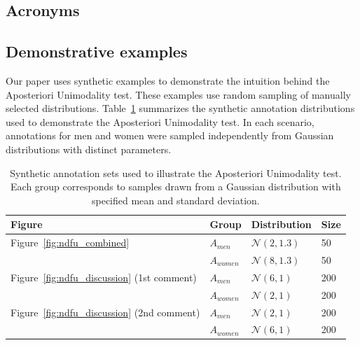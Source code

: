 \documentclass{article}
\begin{document}
\subsection{Acronyms}

\begin{acronym}[WWW]
\end{acronym}


\subsection{Demonstrative examples}

Our paper uses synthetic examples to demonstrate the intuition behind the Aposteriori Unimodality test. These examples use random sampling of manually selected distributions. Table~\ref{tab:synthetic_annotation_sets} summarizes the synthetic annotation distributions used to demonstrate the Aposteriori Unimodality test. In each scenario, annotations for men and women were sampled independently from Gaussian distributions with distinct parameters.

\begin{table}[ht]
\centering
\begin{tabular}{|l|l|l|l|}
\hline
\textbf{Figure} & \textbf{Group} & \textbf{Distribution} & \textbf{Size} \\
\hline
Figure~\ref{fig:ndfu_combined}
  & $A_{men}$   & $\mathcal{N}(2, 1.3)$  & 50 \\
  & $A_{women}$ & $\mathcal{N}(8, 1.3)$  & 50 \\
\hline
Figure~\ref{fig:ndfu_discussion} (1st comment)
  & $A_{men}$   & $\mathcal{N}(6, 1)$  & 200 \\
  & $A_{women}$ & $\mathcal{N}(2, 1)$  & 200 \\
\hline
Figure~\ref{fig:ndfu_discussion} (2nd comment) 
  & $A_{men}$   & $\mathcal{N}(2, 1)$  & 200 \\
  & $A_{women}$ & $\mathcal{N}(6, 1)$  & 200 \\
\hline
\end{tabular}
\caption{Synthetic annotation sets used to illustrate the Aposteriori Unimodality test. Each group corresponds to samples drawn from a Gaussian distribution with specified mean and standard deviation.}
\label{tab:synthetic_annotation_sets}
\end{table}
\end{document}
